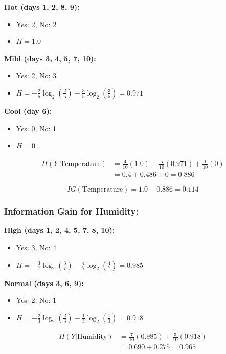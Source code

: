 \documentclass[12pt]{article}
\begin{document}
\textbf{Hot (days 1, 2, 8, 9):}
\begin{itemize}
    \item Yes: 2, No: 2
    \item $H = 1.0$
\end{itemize}

\textbf{Mild (days 3, 4, 5, 7, 10):}
\begin{itemize}
    \item Yes: 2, No: 3
    \item $H = -\frac{2}{5}\log_2\left(\frac{2}{5}\right) - \frac{3}{5}\log_2\left(\frac{3}{5}\right) = 0.971$
\end{itemize}

\textbf{Cool (day 6):}
\begin{itemize}
    \item Yes: 0, No: 1
    \item $H = 0$
\end{itemize}

\begin{align*}
H(Y|\text{Temperature}) &= \frac{4}{10}(1.0) + \frac{5}{10}(0.971) + \frac{1}{10}(0) \\
&= 0.4 + 0.486 + 0 = 0.886
\end{align*}

\begin{equation*}
\boxed{IG(\text{Temperature}) = 1.0 - 0.886 = 0.114}
\end{equation*}

\subsubsection*{Information Gain for Humidity:}

\textbf{High (days 1, 2, 4, 5, 7, 8, 10):}
\begin{itemize}
    \item Yes: 3, No: 4
    \item $H = -\frac{3}{7}\log_2\left(\frac{3}{7}\right) - \frac{4}{7}\log_2\left(\frac{4}{7}\right) = 0.985$
\end{itemize}

\textbf{Normal (days 3, 6, 9):}
\begin{itemize}
    \item Yes: 2, No: 1
    \item $H = -\frac{2}{3}\log_2\left(\frac{2}{3}\right) - \frac{1}{3}\log_2\left(\frac{1}{3}\right) = 0.918$
\end{itemize}

\begin{align*}
H(Y|\text{Humidity}) &= \frac{7}{10}(0.985) + \frac{3}{10}(0.918) \\
&= 0.690 + 0.275 = 0.965
\end{align*}
\end{document}

